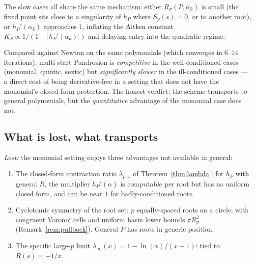 \documentclass[11pt,a4paper]{article}
\theoremstyle{definition}
\begin{document}
The slow cases all share the same mechanism: either $R_\sigma(P, \alpha_k)$ is small (the fixed point sits close to a singularity of $h_P$ where $S_p(s) = 0$, or to another root), or $h_P'(\alpha_k)$ approaches $1$, inflating the Aitken constant $K_S \propto 1/(1 - |h_P'(\alpha_k)|)$ and delaying entry into the quadratic regime.

Compared against Newton on the same polynomials (which converges in $6$--$14$ iterations), multi-start Pandrosion is \emph{competitive} in the well-conditioned cases (monomial, quintic, sextic) but \emph{significantly slower} in the ill-conditioned cases --- a direct cost of being derivative-free in a setting that does not have the monomial's closed-form protection. The honest verdict: the scheme transports to general polynomials, but the \emph{quantitative} advantage of the monomial case does not.

\subsection{What is lost, what transports}

\emph{Lost:} the monomial setting enjoys three advantages not available in general:
\begin{enumerate}
  \item The closed-form contraction ratio $\lambda_{p,x}$ of Theorem~\ref{thm:lambda}: for $h_P$ with general $R$, the multiplier $h_P'(\alpha)$ is computable per root but has no uniform closed form, and can be near $1$ for badly-conditioned roots.
  \item Cyclotomic symmetry of the root set: $p$ equally-spaced roots on a circle, with congruent Voronoï cells and uniform basin lower bounds $\pi R_\sigma^2$ (Remark~\ref{rem:pullback}). General $P$ has roots in generic position.
  \item The specific large-$p$ limit $\lambda_\infty(x) = 1 - \ln(x)/(x-1)$: tied to $R(s) = -1/x$.
\end{enumerate}
\end{document}

